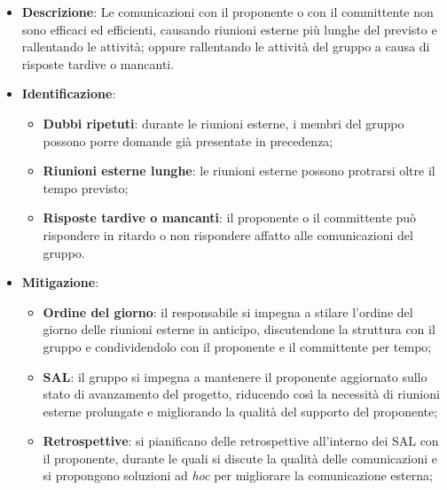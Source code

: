 \label{risk:comunicazione esterna carente}
\begin{itemize}
	\item \textbf{Descrizione}:
	      Le comunicazioni con il proponente o con il committente non sono
	      efficaci ed efficienti, causando riunioni esterne più lunghe del
	      previsto e rallentando le attività; oppure rallentando le attività
	      del gruppo a causa di risposte tardive o mancanti.

	\item \textbf{Identificazione}:
	      \begin{itemize}
		      \item \textbf{Dubbi ripetuti}: durante le riunioni esterne, i
		            membri del gruppo possono porre domande già presentate in
		            precedenza;

		      \item \textbf{Riunioni esterne lunghe}: le riunioni esterne
		            possono protrarsi oltre il tempo previsto;

		      \item \textbf{Risposte tardive o mancanti}: il proponente o il
		            committente può rispondere in ritardo o non rispondere
		            affatto alle comunicazioni del gruppo.
	      \end{itemize}

	\item \textbf{Mitigazione}:
	      \begin{itemize}
		      \item \textbf{Ordine del giorno}: il responsabile si impegna a
		            stilare l'ordine del giorno delle riunioni esterne in anticipo, 
					discutendone la struttura con il gruppo e condividendolo con il 
					proponente e il committente per tempo;

		      \item \textbf{SAL}: il gruppo si impegna a mantenere il
		            proponente aggiornato sullo stato di avanzamento del
		            progetto, riducendo così la necessità di riunioni esterne 
					prolungate e migliorando la qualità del supporto del proponente;

		      \item \textbf{Retrospettive}: si pianificano delle retrospettive all'interno 
			  		dei SAL con il proponente, durante le quali si discute la qualità 
					delle comunicazioni e si propongono soluzioni ad \textit{hoc} per migliorare 
					la comunicazione esterna;


\end{itemize}
\end{itemize}
